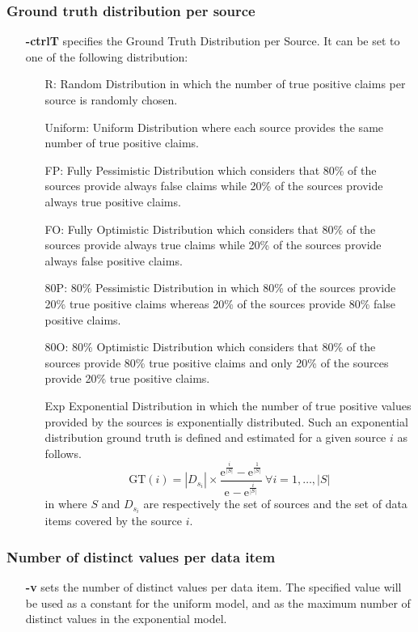 \documentclass[a4paper,10pt]{scrartcl}
\newcommand{\expo}[1]{\ensuremath{\mathrm{e}^{#1}}}
\newcommand{\gt}[1]{\ensuremath{\mathrm{GT}(#1)}}
\begin{document}
\subsubsection{Ground truth distribution per source}
\begin{itemize}
 \item[\textbf{-ctrlT}] specifies the Ground Truth Distribution per Source. It can be set to one of the following distribution:
 \begin{itemize}
  \item[R:] Random Distribution in which the number of true positive claims per source is randomly chosen.
  \item[Uniform:] Uniform Distribution where each source provides the same number of true positive claims.
  \item[FP:] Fully Pessimistic Distribution which considers that 80\% of the sources provide always false claims
  while 20\% of the sources provide always true positive claims.
  \item[FO:] Fully Optimistic Distribution which considers that 80\% of the sources provide always true claims
  while 20\% of the sources provide always false positive claims.
  \item[80P:] 80\% Pessimistic Distribution in which 80\% of the sources provide 20\% true positive claims whereas
  20\% of the sources provide 80\% false positive claims. 
  \item[80O:] 80\% Optimistic Distribution which considers that 80\% of the sources provide 80\% true positive claims 
  and only 20\% of the sources provide 20\% true positive claims.
  \item[Exp] Exponential Distribution in which the number of true positive values provided by the sources is exponentially
  distributed. Such an exponential distribution ground truth is defined and estimated for a given source $i$ as follows.
  \[
   \gt{i} = |D_{s_i}| \times \frac{\expo{\frac{i}{|S|}} - \expo{\frac{1}{|S|}}}{\expo{} - \expo{\frac{i}{|S|}}}~\forall i= 1, \ldots,|S|
  \]
in where $S$ and $D_{s_i}$ are respectively the set of sources and the set of data items covered by the source $i$.
 \end{itemize}
\end{itemize}
\subsubsection{Number of distinct values per data item}
\begin{itemize}
 \item[\textbf{-v}] sets the number of distinct values per data item. The specified value will be used as a constant for the uniform 
 model, and as the maximum number of distinct values in the exponential model.
\end{itemize}
\end{document}

